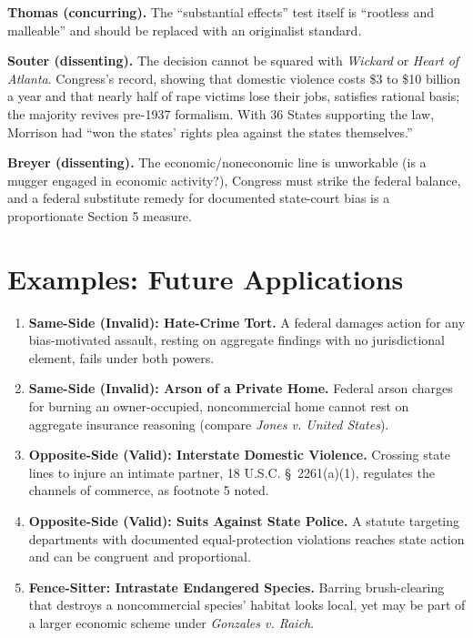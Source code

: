 \documentclass[12pt]{article}
\begin{document}
\textbf{Thomas (concurring).} The ``substantial effects'' test itself is ``rootless and malleable'' and should be replaced with an originalist standard.

\textbf{Souter (dissenting).} The decision cannot be squared with \textit{Wickard} or \textit{Heart of Atlanta}. Congress's record, showing that domestic violence costs \$3 to \$10 billion a year and that nearly half of rape victims lose their jobs, satisfies rational basis; the majority revives pre-1937 formalism. With 36 States supporting the law, Morrison had ``won the states' rights plea against the states themselves.''

\textbf{Breyer (dissenting).} The economic/noneconomic line is unworkable (is a mugger engaged in economic activity?), Congress must strike the federal balance, and a federal substitute remedy for documented state-court bias is a proportionate Section 5 measure.

\section{Examples: Future Applications}

\begin{enumerate}
\item \textbf{Same-Side (Invalid): Hate-Crime Tort.} A federal damages action for any bias-motivated assault, resting on aggregate findings with no jurisdictional element, fails under both powers.
\item \textbf{Same-Side (Invalid): Arson of a Private Home.} Federal arson charges for burning an owner-occupied, noncommercial home cannot rest on aggregate insurance reasoning (compare \textit{Jones v. United States}).
\item \textbf{Opposite-Side (Valid): Interstate Domestic Violence.} Crossing state lines to injure an intimate partner, 18 U.S.C. \S~2261(a)(1), regulates the channels of commerce, as footnote 5 noted.
\item \textbf{Opposite-Side (Valid): Suits Against State Police.} A statute targeting departments with documented equal-protection violations reaches state action and can be congruent and proportional.
\item \textbf{Fence-Sitter: Intrastate Endangered Species.} Barring brush-clearing that destroys a noncommercial species' habitat looks local, yet may be part of a larger economic scheme under \textit{Gonzales v. Raich}.
\end{enumerate}
\end{document}
